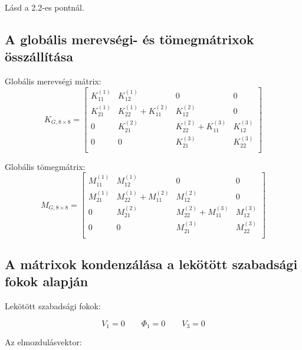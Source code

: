 \documentclass{article}
\begin{document}
		Lásd a 2.2-es pontnál.
	
		\subsection{A globális merevségi- és tömegmátrixok összállítása}
		
			Globális merevségi mátrix:
			\begin{equation}
				K_{G,8\times8}=
				\begin{bmatrix}
				K_{11}^{(1)} & K_{12}^{(1)}              & 0            			    & 0            \\
				K_{21}^{(1)} & K_{22}^{(1)}+K_{11}^{(2)} & K_{12}^{(2)}  			    & 0            \\
				0            & K_{21}^{(2)}              & K_{22}^{(2)} + K_{11}^{(3)}  & K_{12}^{(3)} \\
				0            & 0						 & K_{21}^{(3)} 					& K_{22}^{(3)} \\
				\end{bmatrix}
			\end{equation}
			
			Globális tömegmátrix:
			\begin{equation}
			M_{G,8\times8}=
			\begin{bmatrix}
			M_{11}^{(1)} & M_{12}^{(1)}              & 0            			    & 0            \\
			M_{21}^{(1)} & M_{22}^{(1)}+M_{11}^{(2)} & M_{12}^{(2)}  			    & 0            \\
			0            & M_{21}^{(2)}              & M_{22}^{(2)} + M_{11}^{(3)}  & M_{12}^{(3)} \\
			0            & 0						 & M_{21}^{(3)} 					& M_{22}^{(3)} \\
			\end{bmatrix}
			\end{equation}
	
	
		\subsection{A mátrixok kondenzálása a lekötött szabadsági fokok alapján}
		
			Lekötött szabadsági fokok:
			
			\[V_{1}=0 \qquad \Phi_{1}=0 \qquad V_{3}=0\]	
			
			Az elmozdulásvektor:
			
\end{document}

